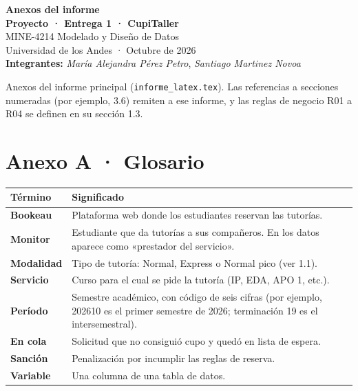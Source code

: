 \documentclass[11pt,letterpaper]{article}
\begin{document}
\begin{center}
{\Large\bfseries Anexos del informe\\[2pt] Proyecto · Entrega 1 · CupiTaller}\\[8pt]
MINE-4214 Modelado y Diseño de Datos\\
Universidad de los Andes · Octubre de 2026\\[6pt]
\textbf{Integrantes:} \emph{María Alejandra Pérez Petro}, \emph{Santiago Martinez Novoa}
\end{center}
\tableofcontents
\vspace{4pt}
Anexos del informe principal (\texttt{informe\_latex.tex}). Las referencias a secciones numeradas (por ejemplo, 3.6) remiten a ese informe, y las reglas de negocio R01 a R04 se definen en su sección 1.3.
\bigskip
\section*{Anexo A · Glosario}

\begingroup\small\setlength{\tabcolsep}{4pt}\renewcommand{\arraystretch}{1.15}
\begin{longtable}{>{\raggedright\arraybackslash}p{}>{\raggedright\arraybackslash}p{}}
\toprule
\textbf{Término} & \textbf{Significado} \\
\midrule
\endhead
\textbf{Bookeau} & Plataforma web donde los estudiantes reservan las tutorías. \\
\textbf{Monitor} & Estudiante que da tutorías a sus compañeros. En los datos aparece como «prestador del servicio». \\
\textbf{Modalidad} & Tipo de tutoría: Normal, Express o Normal pico (ver 1.1). \\
\textbf{Servicio} & Curso para el cual se pide la tutoría (IP, EDA, APO 1, etc.). \\
\textbf{Período} & Semestre académico, con código de seis cifras (por ejemplo, 202610 es el primer semestre de 2026; terminación 19 es el intersemestral). \\
\textbf{En cola} & Solicitud que no consiguió cupo y quedó en lista de espera. \\
\textbf{Sanción} & Penalización por incumplir las reglas de reserva. \\
\textbf{Variable} & Una columna de una tabla de datos. \\
\bottomrule
\end{longtable}
\endgroup
\end{document}
